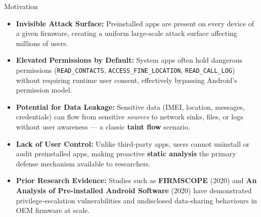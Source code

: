 \documentclass[aspectratio=169]{beamer}
\begin{document}
\begin{frame}{Motivation}
\begin{itemize}
    \item \textbf{Invisible Attack Surface:}
          Preinstalled apps are present on every device of a given firmware,
          creating a uniform large-scale attack surface affecting millions of users.

    \item \textbf{Elevated Permissions by Default:}
          System apps often hold dangerous permissions
          (\texttt{READ\_CONTACTS}, \texttt{ACCESS\_FINE\_LOCATION},
          \texttt{READ\_CALL\_LOG}) without requiring runtime user consent,
          effectively bypassing Android's permission model.

    \item \textbf{Potential for Data Leakage:}
          Sensitive data (IMEI, location, messages, credentials) can flow from
          sensitive \textit{sources} to network sinks, files, or logs without user
          awareness — a classic \textbf{taint flow} scenario.

    \item \textbf{Lack of User Control:}
          Unlike third-party apps, users cannot uninstall or audit preinstalled
          apps, making proactive \textbf{static analysis} the primary defense
          mechanism available to researchers.

    \item \textbf{Prior Research Evidence:}
          Studies such as \textbf{FIRMSCOPE} (2020) and \textbf{An Analysis of
          Pre-installed Android Software} (2020) have demonstrated privilege-escalation
          vulnerabilities and undisclosed data-sharing behaviours in OEM firmware at scale.
\end{itemize}
\end{frame}
\end{document}
